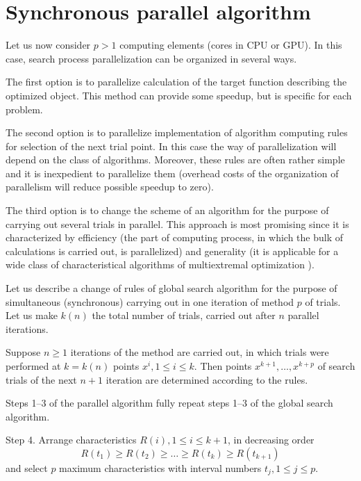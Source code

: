 \documentclass[smallcondensed]{svjour3}     %
\begin{document}
\section{Synchronous parallel algorithm} \label{sec:3}

Let us now consider $p>1$ computing elements (cores in CPU or GPU). In this case, search process parallelization can be organized in several ways.

The first option is to parallelize calculation of the target function describing the optimized object. This method can provide some speedup, but is specific for each problem.

The second option is to parallelize implementation of algorithm computing rules for selection of the next trial point. In this case the way of parallelization will depend on the class of algorithms. Moreover, these rules are often rather simple and it is inexpedient to parallelize them (overhead costs of the organization of parallelism will reduce possible speedup to zero).

The third option is to  change the scheme of an algorithm for the purpose of carrying out several trials in parallel. This approach is most promising since it is characterized by efficiency (the part of computing process, in which the bulk of calculations is carried out, is parallelized) and generality (it is applicable for a wide class of characteristical algorithms of multiextremal optimization \cite{RefGrishagin1997}).

Let us describe a change of rules of global search algorithm for the purpose of simultaneous (synchronous) carrying out in one iteration of method $p$ of trials. Let us make $k(n)$ the total number of trials, carried out after $n$ parallel iterations.

Suppose $n\geq 1$  iterations of the method are carried out, in which trials were performed at $k=k(n)$ points $x^i,1\leq i \leq k$. Then points $x^{k+1},\dots,x^{k+p}$  of search trials of the next $n+1$ iteration are determined according to the rules.

Steps 1--3 of the parallel algorithm fully repeat steps 1--3 of the global search algorithm.

Step 4. Arrange characteristics  $R(i), 1 \leq i \leq k+1$, in decreasing order 
\begin{equation}\label{eq:21}
R(t_1)\geq R(t_2)\geq \dots \geq R(t_{k}) \geq R(t_{k+1})
\end{equation}
and select $p$ maximum characteristics with interval numbers $t_j, 1\leq j \leq p$.
\end{document}
